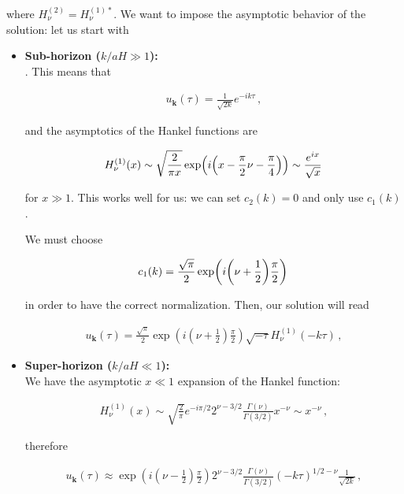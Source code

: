 where \(H^{(2)}_\nu = H^{(1)*}_\nu\). 
We want to impose the asymptotic behavior of the solution: let us start with 
\begin{itemize}
    \item \textbf{Sub-horizon (\(k / aH \gg 1\)):}\\ . 
    This means that 
    
    \begin{align*}
         u_{\mathbf{k}}(\tau ) = \frac{1}{\sqrt{2k}} e^{-ik \tau }
        \,,
    \end{align*}
        
    
    
    and the asymptotics of the Hankel functions are
    
    \begin{align}
        H^{(1)}_\nu  (x) \sim \sqrt{ \frac{2}{\pi x}} \exp(i \qty(x - \frac{\pi}{2} \nu - \frac{\pi}{4})) \sim \frac{e^{ix}}{\sqrt{x}} \, \label{2.96}
    \end{align}
    
    for \(x \gg 1\). This works well for us: we can set \(c_2 (k) = 0\) and only use \(c_1 (k)\). 
    
    We must choose 
    
    \begin{align}
        c_1 (k) = \frac{\sqrt{\pi }}{2} \exp(i \qty(\nu + \frac{1}{2}) \frac{\pi}{2})\,\label{2.97}
    \end{align}
    
    in order to have the correct normalization. 
    Then, our solution will read 
    
    \begin{align}
         u_{\mathbf{k}}(\tau ) = \frac{\sqrt{\pi }}{2} \exp(i ( \nu + \frac{1}{2}) \frac{\pi}{2}) \sqrt{-\tau } H^{(1)}_\nu (- k \tau )
        \,,\label{2.98}
    \end{align}
    \item \textbf{Super-horizon (\(k /aH \ll 1\)):}\\
    We have the asymptotic \(x \ll 1\) expansion of the Hankel function:

    \begin{align}
        H^{(1)}_\nu (x) \sim \sqrt{ \frac{2}{\pi }} e^{- i \pi /2}
        2^{\nu - 3/2} \frac{\Gamma (\nu )}{\Gamma (3/2)} x^{-\nu } \sim x^{-\nu }
        \,,\label{2.99}
    \end{align}
    
    therefore 
    
    \begin{align}
         u_{\mathbf{k}}(\tau ) \approx \exp(i (\nu - \frac{1}{2}) \frac{\pi}{2})
        2^{\nu - 3/2}
        \frac{\Gamma (\nu )}{\Gamma (3/2)}
        (- k \tau )^{1/2 - \nu } \frac{1}{\sqrt{2 k}} 
        \,,\label{2.100}
    \end{align}
\end{itemize}

